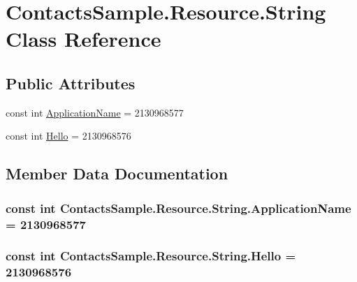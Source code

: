 \hypertarget{class_contacts_sample_1_1_resource_1_1_string}{\section{Contacts\+Sample.\+Resource.\+String Class Reference}
\label{class_contacts_sample_1_1_resource_1_1_string}
}
\subsection*{Public Attributes}
\begin{DoxyCompactItemize}
\item 
const int \hyperlink{class_contacts_sample_1_1_resource_1_1_string_a36f5c1382e57f38c27c8c2805a00baa4}{Application\+Name} = 2130968577
\item 
const int \hyperlink{class_contacts_sample_1_1_resource_1_1_string_a34bfa5c3f2980162b50b8798f01773dc}{Hello} = 2130968576
\end{DoxyCompactItemize}


\subsection{Member Data Documentation}
\hypertarget{class_contacts_sample_1_1_resource_1_1_string_a36f5c1382e57f38c27c8c2805a00baa4}{
\subsubsection[{Application\+Name}]{\setlength{\rightskip}{0pt plus 5cm}const int Contacts\+Sample.\+Resource.\+String.\+Application\+Name = 2130968577}}\label{class_contacts_sample_1_1_resource_1_1_string_a36f5c1382e57f38c27c8c2805a00baa4}
\hypertarget{class_contacts_sample_1_1_resource_1_1_string_a34bfa5c3f2980162b50b8798f01773dc}{
\subsubsection[{Hello}]{\setlength{\rightskip}{0pt plus 5cm}const int Contacts\+Sample.\+Resource.\+String.\+Hello = 2130968576}}\label{class_contacts_sample_1_1_resource_1_1_string_a34bfa5c3f2980162b50b8798f01773dc}


